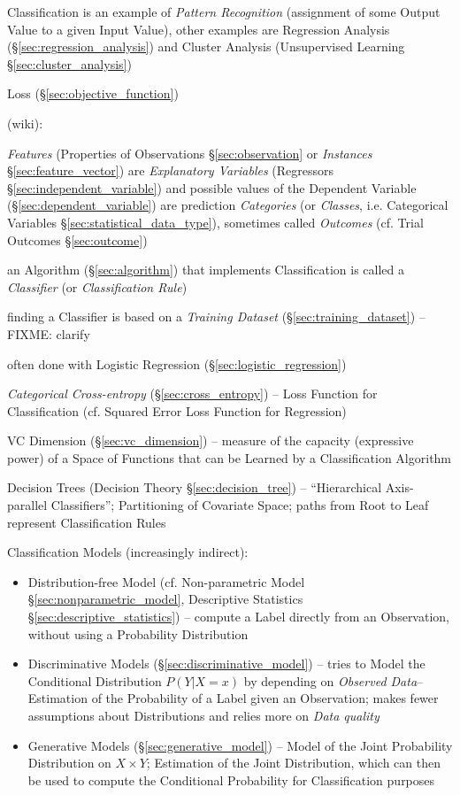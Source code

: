 Classification is an example of \emph{Pattern Recognition} (assignment of some
Output Value to a given Input Value), other examples are Regression Analysis
(\S\ref{sec:regression_analysis}) and Cluster Analysis (Unsupervised Learning
\S\ref{sec:cluster_analysis})

Loss (\S\ref{sec:objective_function})

(wiki):

\emph{Features} (Properties of Observations \S\ref{sec:observation} or
\emph{Instances} \S\ref{sec:feature_vector}) are \emph{Explanatory Variables}
(Regressors \S\ref{sec:independent_variable}) and possible values of the
Dependent Variable (\S\ref{sec:dependent_variable}) are prediction
\emph{Categories} (or \emph{Classes}, i.e. Categorical Variables
\S\ref{sec:statistical_data_type}), sometimes called \emph{Outcomes} (cf. Trial
Outcomes \S\ref{sec:outcome})

an Algorithm (\S\ref{sec:algorithm}) that implements Classification is called a
\emph{Classifier} (or \emph{Classification Rule})

finding a Classifier is based on a \emph{Training Dataset}
(\S\ref{sec:training_dataset}) --FIXME: clarify

often done with Logistic Regression (\S\ref{sec:logistic_regression})

\emph{Categorical Cross-entropy} (\S\ref{sec:cross_entropy}) -- Loss Function
for Classification (cf. Squared Error Loss Function for Regression)

\fist VC Dimension (\S\ref{sec:vc_dimension}) -- measure of the capacity
(expressive power) of a Space of Functions that can be Learned by a
Classification Algorithm

\fist Decision Trees (Decision Theory \S\ref{sec:decision_tree}) --
``Hierarchical Axis-parallel Classifiers''; Partitioning of Covariate Space;
paths from Root to Leaf represent Classification Rules

Classification Models (increasingly indirect):
\begin{itemize}
  \item Distribution-free Model (cf. Non-parametric Model
    \S\ref{sec:nonparametric_model}, Descriptive Statistics
    \S\ref{sec:descriptive_statistics}) -- compute a Label directly from an
    Observation, without using a Probability Distribution
  \item Discriminative Models (\S\ref{sec:discriminative_model}) -- tries to
    Model the Conditional Distribution $P(Y|X = x)$ by depending on
    \emph{Observed Data}-- Estimation of the Probability of a Label given an
    Observation; makes fewer assumptions about Distributions and relies
    more on \emph{Data quality}
  \item Generative Models (\S\ref{sec:generative_model}) -- Model of the
    Joint Probability Distribution on $X \times Y$; Estimation of the Joint
    Distribution, which can then be used to compute the Conditional Probability
    for Classification purposes
\end{itemize}

